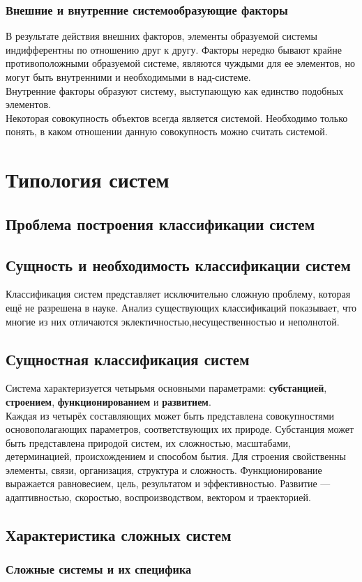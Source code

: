\documentclass{article}
\newcommand{\important}[1]{\textbf{#1}}
\begin{document}
\subsubsection*{Внешние и внутренние системообразующие факторы}
В результате действия внешних факторов, элементы образуемой системы индифферентны по отношению друг к другу. Факторы нередко бывают крайне противоположными образуемой системе, являются чуждыми для ее элементов, но могут быть внутренними и необходимыми в над-системе.
\\
Внутренние факторы образуют систему, выступающую как единство подобных элементов.
\\
Некоторая совокупность объектов всегда является системой. Необходимо только понять, в каком отношении данную совокупность можно считать системой.
\section{Типология систем}
\subsection{Проблема построения классификации систем}
\subsection*{Сущность и необходимость классификации систем}
Классификация систем представляет исключительно сложную проблему, которая ещё не разрешена в науке. Анализ существующих классификаций показывает, что многие из них отличаются эклектичностью,несущественностью и неполнотой.
\subsection*{Сущностная классификация систем}
Система характеризуется четырьмя основными параметрами: \important{субстанцией}, \important{строением}, \important{функционированием} и \important{развитием}.
\\
Каждая из четырёх составляющих может быть представлена совокупностями основополагающих параметров, соответствующих их природе. Субстанция может быть представлена природой систем, их сложностью, масштабами, детерминацией, происхождением и способом бытия. Для строения свойственны элементы, связи, организация, структура и сложность. Функционирование выражается равновесием, цель, результатом и эффективностью. Развитие --- адаптивностью, скоростью, воспроизводством, вектором и траекторией.
\subsection{Характеристика сложных систем}
\subsubsection*{Сложные системы и их специфика}
\end{document}
